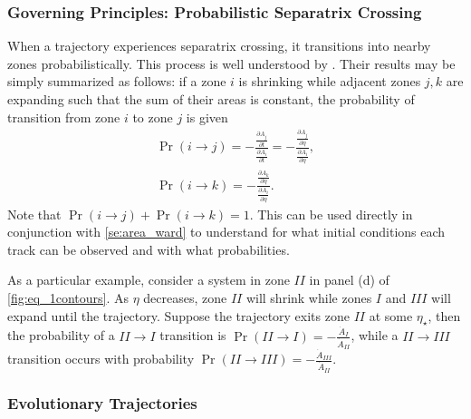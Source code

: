 \documentclass[
        fleqn,
        usenatbib,
        referee,
    ]{mnras}
\newcommand*{\pd}[2]{\frac{\partial#1}{\partial#2}}
\newcommand*{\p}[1]{\left(#1\right)}
\begin{document}
\subsubsection{Governing Principles: Probabilistic Separatrix Crossing}

When a trajectory experiences separatrix crossing, it transitions into nearby
zones probabilistically. This process is well understood by
\citealp{henrard1982,henrard1987}. Their results may be simply summarized as
follows: if a zone $i$ is shrinking while adjacent zones $j, k$ are expanding
such that the sum of their areas is constant, the probability of transition from
zone $i$ to zone $j$ is given
\begin{align}
    \Pr\p{i \to j} = -\frac{\pd{A_j}{t}}{ \pd{A_i}{t}}
        = -\frac{\pd{A_j}{\eta}}{ \pd{A_i}{\eta}},\\
    \Pr\p{i \to k}
        = -\frac{\pd{A_k}{\eta}}{ \pd{A_i}{\eta}}.\label{eq:henrard_hop}
\end{align}
Note that $\Pr \p{i \to j} + \Pr\p{i \to k} = 1$. This can be used directly in
conjunction with \autoref{se:area_ward} to understand for what initial
conditions each track can be observed and with what probabilities.

As a particular example, consider a system in zone $II$ in panel (d) of
\autoref{fig:eq_1contours}. As $\eta$ decreases, zone $II$ will shrink while
zones $I$ and $III$ will expand until the trajectory. Suppose the trajectory
exits zone $II$ at some $\eta_\star$, then the probability of a $II \to I$
transition is $\Pr\p{II \to I} = -\frac{\dot{A}_{I}}{\dot{A}_{II}}$, while a $II
\to III$ transition occurs with probability $\Pr\p{II \to III} =
-\frac{\dot{A}_{III}}{\dot{A}_{II}}$.

\subsubsection{Evolutionary Trajectories}\label{sss:evol_traj}
\end{document}
